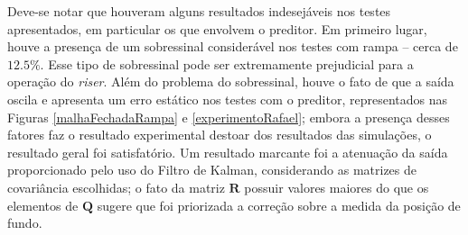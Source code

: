 Deve-se notar que houveram alguns resultados indesejáveis nos testes apresentados, em particular os que envolvem o preditor. Em primeiro lugar, houve a presença de um sobressinal considerável nos testes com rampa -- cerca de $12.5\%$. Esse tipo de sobressinal pode ser extremamente prejudicial para a operação do \textit{riser}. Além do problema do sobressinal, houve o fato de que a saída oscila e apresenta um erro estático nos testes com o preditor, representados nas Figuras \ref{malhaFechadaRampa} e \ref{experimentoRafael}; embora a presença desses fatores faz o resultado experimental destoar dos resultados das simulações, o resultado geral foi satisfatório. Um resultado marcante foi a atenuação da saída proporcionado pelo uso do Filtro de Kalman, considerando as matrizes de covariância escolhidas; o fato da matriz $\mathbf{R}$ possuir valores maiores do que os elementos de $\mathbf{Q}$ sugere que foi priorizada a correção sobre a medida da posição de fundo.